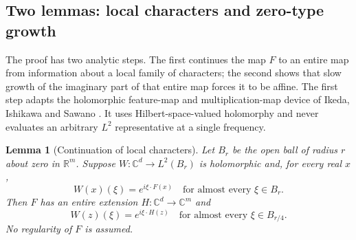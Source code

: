 \documentclass[11pt,a4paper]{article}
\newtheorem{lemma}[theorem]{Lemma}
\theoremstyle{remark}
\newcommand{\R}{\mathbb R}
\newcommand{\C}{\mathbb C}
\begin{document}
\subsection{Two lemmas: local characters and zero-type growth}\label{sec:characters}

The proof has two analytic steps. The first continues the map $F$ to an
entire map from information about a local family of characters; the
second shows that slow growth of the imaginary part of that entire map
forces it to be affine. The first step adapts the holomorphic
feature-map and multiplication-map device of Ikeda, Ishikawa and Sawano
\cite[Theorem~4 and Proposition~12]{Ikeda2022}. It uses
Hilbert-space-valued holomorphy and never evaluates an arbitrary $L^2$
representative at a single frequency.

\begin{lemma}[Continuation of local characters]\label{lem:characters}
Let $B_r$ be the open ball of radius $r$ about zero in $\R^m$.
Suppose $W:\C^d\to L^2(B_r)$ is holomorphic and, for every real $x$,
\[
 W(x)(\xi)=e^{i\xi\cdot F(x)}
 \quad\text{for almost every }\xi\in B_r.
\]
Then $F$ has an entire extension $H:\C^d\to\C^m$ and
\[
 W(z)(\xi)=e^{i\xi\cdot H(z)}
 \quad\text{for almost every }\xi\in B_{r/4}.
\]
No regularity of $F$ is assumed.
\end{lemma}
\end{document}
